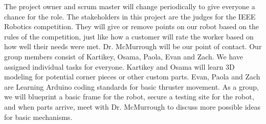 The project owner and scrum master will change periodically to give everyone a chance for the role. The stakeholders in this project are the judges for the IEEE Robotics competition. They will give or remove points on our robot based on the rules of the competition, just like how a customer will rate the worker based on how well their needs were met. Dr. McMurrough will be our point of contact. Our group members consist of Kartikey, Osama, Paola, Evan and Zach. We have assigned individual tasks for everyone. Kartikey and Osama will learn 3D modeling for potential corner pieces or other custom parts. Evan, Paola and Zach are Learning Arduino coding standards for basic thruster movement. As a group, we will blueprint a basic frame for the robot, secure a testing site for the robot, and when parts arrive, meet with Dr. McMurrough to discuss more possible ideas for basic mechanisms.